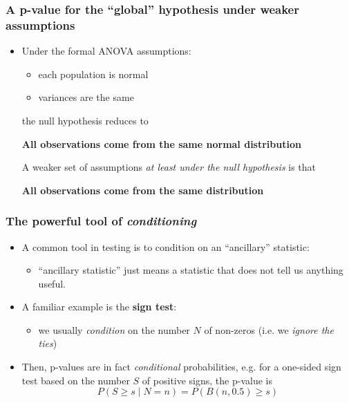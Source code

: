 \documentclass[a4paper]{article}
\begin{document}
\subsubsection{A p-value for the ``global'' hypothesis under weaker assumptions}
\begin{itemize}
	\item Under the formal ANOVA assumptions:
	\begin{itemize}
		\item each population is normal
		\item variances are the same
	\end{itemize}
	the null hypothesis reduces to
	\begin{tcolorbox}[goldstyleline, halign= flush center]
		\textbf{All observations come from the same normal distribution}
	\end{tcolorbox}
	A weaker set of assumptions \textit{at least under the null hypothesis} is that
	\begin{tcolorbox}[goldstyleline, halign= flush center]
		\textbf{All observations come from the same distribution}
	\end{tcolorbox}
\end{itemize}
\subsubsection{The powerful tool of \textit{conditioning}}
\begin{itemize}
	\item A common tool in testing is to condition on an ``ancillary'' statistic:
	\begin{itemize}
		\item ``ancillary statistic'' just means a statistic that does not tell us anything useful.
	\end{itemize}
	\item A familiar example is the \textbf{sign test}:
	\begin{itemize}
		\item we usually \textit{condition} on the number \( N \) of non-zeros (i.e. we \textit{ignore the ties})
	\end{itemize}
	\item Then, p-values are in fact \textit{conditional} probabilities, e.g. for a one-sided sign test based on the number \( S \) of positive signs, the p-value is
	\[
		P(S\geq s \mid N=n) = P(B(n,0.5) \geq s)
	\]
\end{itemize}
\end{document}
